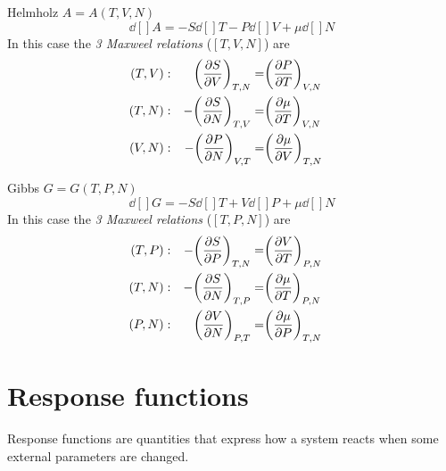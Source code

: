 \documentclass[../main/main.tex]{subfiles}
\begin{document}
\begin{example}{Helmholz \( A=A(T,V,N) \)}{}
\begin{equation}
  \dd[]{A} = - S \dd[]{T} - P \dd[]{V} + \mu \dd[]{N}
\end{equation}
In this case the \emph{3 Maxweel relations} (\( [T,V,N] \)) are
\begin{subequations}
\begin{align}
  (T,V) &:& \qty(\pdv{S}{V} )_{T,N} =&  \qty(\pdv{P}{T} )_{V,N} & \\
  (T,N) &:& -\qty(\pdv{S}{N} )_{T,V} =& \qty(\pdv{\mu }{T} )_{V,N} &\\
  (V,N) &:& -\qty(\pdv{P}{N} )_{V,T} =& \qty(\pdv{\mu }{V} )_{T,N} &
 \end{align}
\label{}
\end{subequations}
\end{example}
\begin{example}{Gibbs \( G=G(T,P,N) \) }{}
  \begin{equation}
    \dd[]{G} = - S \dd[]{T} + V \dd[]{P} + \mu \dd[]{N}
  \end{equation}
  In this case the \emph{3 Maxweel relations} (\( [T,P,N] \)) are
  \begin{subequations}
  \begin{align}
    (T,P) &:& -\qty(\pdv{S}{P} )_{T,N} =&  \qty(\pdv{V}{T} )_{P,N} & \\
    (T,N) &:& -\qty(\pdv{S}{N} )_{T,P} =& \qty(\pdv{\mu }{T} )_{P,N} &\\
    (P,N) &:& \qty(\pdv{V}{N} )_{P,T} =& \qty(\pdv{\mu }{P} )_{T,N} &
   \end{align}
  \label{}
  \end{subequations}
\end{example}

\section{Response functions}
Response functions are quantities that express how a system reacts when some external parameters are changed.
\end{document}
